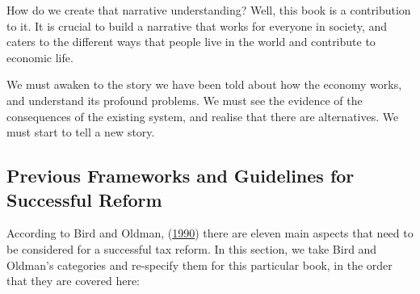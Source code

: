 \documentclass[]{tufte-handout}
\begin{document}
How do we create that narrative understanding? Well, this book is a
contribution to it. It is crucial to build a narrative that works for
everyone in society, and caters to the different ways that people live
in the world and contribute to economic life.

We must awaken to the story we have been told about how the economy
works, and understand its profound problems. We must see the evidence of
the consequences of the existing system, and realise that there are
alternatives. We must start to tell a new story.

\hypertarget{previous-frameworks-and-guidelines-for-successful-reform}{%
\subsection{Previous Frameworks and Guidelines for Successful
Reform}\label{previous-frameworks-and-guidelines-for-successful-reform}}

According to Bird and Oldman,
(\protect\hyperlink{ref-BirdAndOldman}{1990}) there are eleven main
aspects that need to be considered for a successful tax reform. In this
section, we take Bird and Oldman's categories and re-specify them for
this particular book, in the order that they are covered here:
\end{document}
